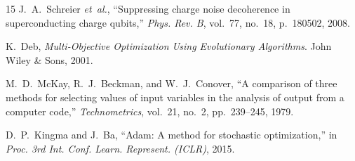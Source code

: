 \documentclass[journal,10pt,twocolumn]{IEEEtran}
\begin{document}
\begin{thebibliography}{15}
J.~A.~Schreier \emph{et~al.}, ``Suppressing charge noise decoherence in superconducting charge qubits,'' \emph{Phys. Rev. B}, vol.~77, no.~18, p.~180502, 2008.

K.~Deb, \emph{Multi-Objective Optimization Using Evolutionary Algorithms}. John Wiley \& Sons, 2001.

M.~D.~McKay, R.~J.~Beckman, and W.~J.~Conover, ``A comparison of three methods for selecting values of input variables in the analysis of output from a computer code,'' \emph{Technometrics}, vol.~21, no.~2, pp.~239--245, 1979.

D.~P.~Kingma and J.~Ba, ``Adam: A method for stochastic optimization,'' in \emph{Proc. 3rd Int. Conf. Learn. Represent. (ICLR)}, 2015.
\end{thebibliography}
\end{document}
